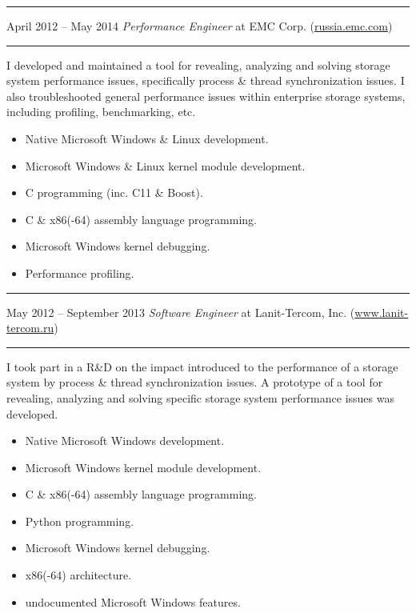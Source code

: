 \documentclass[11pt]{article}
\newcommand\CXX{C\nolinebreak[4]\hspace{-.05em}\raisebox{.4ex}{\relsize{-3}{\textbf{++}}}}
\newcommand\CvSmallSkipLength{0.5em}
\newcommand\CvSkip[1]{\vspace{#1}}
\newcommand\CvSmallSkip{\CvSkip{\CvSmallSkipLength}}
\newcommand\CvRule{\begingroup\color{CvRuleColor}\hrule\endgroup}
\newcommand\CvWorkplaceHeader[5]{\begingroup%
  \CvRule\nopagebreak%
  \fboxsep0pt%
  \colorbox{CvWorkplaceHeaderColor}{%
    \begin{minipage}{\linewidth-2\fboxsep}%
\CvSmallSkip%
#1 -- #2 \hfill \textit{#3} at #4 (\href{http://#5/}{#5})%
\CvSmallSkip%
    \end{minipage}%
  }%
  \CvRule%
\endgroup%
}
\newenvironment{CvWorkplaceDescription}{%
    \begingroup\setlength\parskip{\CvSmallSkipLength}%
  }{%
    \CvSmallSkip\endgroup%
  }
\begin{document}
\CvWorkplaceHeader{April 2012}{May 2014}{Performance Engineer}{EMC Corp.}{russia.emc.com}

\begin{CvWorkplaceDescription}
I developed and maintained a tool for revealing, analyzing and solving storage
system performance issues, specifically process \& thread synchronization
issues.
I also troubleshooted general performance issues within enterprise storage
systems, including profiling, benchmarking, etc.

\begin{itemize}[noitemsep]
  \item Native Microsoft Windows \& Linux development.
  \item Microsoft Windows \& Linux kernel module development.
  \item {\CXX} programming (inc. {\CXX}11 \& Boost).
  \item C \& x86(-64) assembly language programming.
  \item Microsoft Windows kernel debugging.
  \item Performance profiling.
\end{itemize}
\end{CvWorkplaceDescription}

\CvWorkplaceHeader{May 2012}{September 2013}{Software Engineer}{Lanit-Tercom, Inc.}{www.lanit-tercom.ru}

\begin{CvWorkplaceDescription}
I took part in a R\&D on the impact introduced to the performance of a storage
system by process \& thread synchronization issues.
A prototype of a tool for revealing, analyzing and solving specific storage
system performance issues was developed.

\begin{itemize}[noitemsep]
  \item Native Microsoft Windows development.
  \item Microsoft Windows kernel module development.
  \item C \& x86(-64) assembly language programming.
  \item Python programming.
  \item Microsoft Windows kernel debugging.
  \item x86(-64) architecture.
  \item undocumented Microsoft Windows features.
\end{itemize}
\end{CvWorkplaceDescription}
\end{document}
